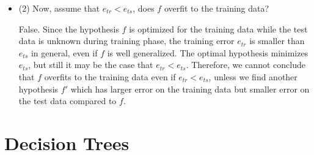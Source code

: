 \begin{enumerate}
\begin{itemize}
\item (2) Now, assume that $e_{tr} < e_{ts}$, does $f$ overfit to the training data?

False. Since the hypothesis $f$ is optimized for the training data while the test data is unknown during training phase, the training error $e_{tr}$ is smaller than $e_{ts}$ in general, even if $f$ is well generalized. The optimal hypothesis minimizes $e_{ts}$, but still it may be the case that $e_{tr} < e_{ts}$. Therefore, we cannot conclude that $f$ overfits to the training data even if $e_{tr} < e_{ts}$, unless we find another hypothesis $f'$ which has larger error on the training data but smaller error on the test data compared to $f$.

\end{itemize}

\end{enumerate}

\section{Decision Trees}


